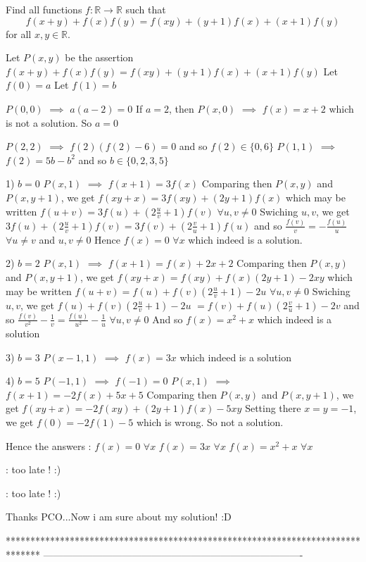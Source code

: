 \begin{solution}
	\begin{tcolorbox}Find all functions $f : \mathbb{R} \rightarrow \mathbb{R}$ such that
\[f(x+y) + f(x)f(y) = f(xy) + (y+1)f(x) + (x+1)f(y)\]
for all $x,y \in \mathbb{R}$.\end{tcolorbox}
Let $P(x,y)$ be the assertion $f(x+y)+f(x)f(y)=f(xy)+(y+1)f(x)+(x+1)f(y)$
Let $f(0)=a$
Let $f(1)=b$

$P(0,0)$ $\implies$ $a(a-2)=0$
If $a=2$, then $P(x,0)$ $\implies$ $f(x)=x+2$ which is not a solution.
So $a=0$

$P(2,2)$ $\implies$ $f(2)(f(2)-6)=0$ and so $f(2)\in\{0,6\}$
$P(1,1)$ $\implies$ $f(2)=5b-b^2$ and so $b\in\{0,2,3,5\}$

1) $b=0$
$P(x,1)$ $\implies$ $f(x+1)=3f(x)$
Comparing then $P(x,y)$ and $P(x,y+1)$, we get $f(xy+x)=3f(xy)+(2y+1)f(x)$ which may be written $f(u+v)=3f(u)+(2\frac uv+1)f(v)$ $\forall u,v\ne 0$
Swiching $u,v$, we get $3f(u)+(2\frac uv+1)f(v)=3f(v)+(2\frac vu +1)f(u)$ and so $\frac{f(v)}v=-\frac{f(u)}u$ $\forall u\ne v$ and $u,v\ne 0$
Hence $f(x)=0$ $\forall x$ which indeed is a solution.

2) $b=2$
$P(x,1)$ $\implies$ $f(x+1)=f(x)+2x+2$
Comparing then $P(x,y)$ and $P(x,y+1)$, we get $f(xy+x)=f(xy)+f(x)(2y+1)-2xy$ which may be written $f(u+v)=f(u)+f(v)(2\frac uv+1)-2u$ $\forall u,v\ne 0$
Swiching $u,v$, we get $f(u)+f(v)(2\frac uv+1)-2u$ $=f(v)+f(u)(2\frac vu+1)-2v$ and so $\frac{f(v)}{v^2}-\frac 1v=\frac{f(u)}{u^2}-\frac 1u$ $\forall u,v\ne 0$
And so $f(x)=x^2+x$ which indeed is a solution

3) $b=3$
$P(x-1,1)$ $\implies$ $f(x)=3x$ which indeed is a solution

4) $b=5$
$P(-1,1)$ $\implies$ $f(-1)=0$
$P(x,1)$ $\implies$ $f(x+1)=-2f(x)+5x+5$
Comparing then $P(x,y)$ and $P(x,y+1)$, we get $f(xy+x)=-2f(xy)+(2y+1)f(x)-5xy$
Setting there $x=y=-1$, we get $f(0)=-2f(1)-5$ which is wrong.
So not a solution.

Hence the answers :
$f(x)=0$ $\forall x$
$f(x)=3x$ $\forall x$
$f(x)=x^2+x$ $\forall x$


: too late ! :)
\end{solution}



\begin{solution}
	\begin{tcolorbox}

: too late ! :)\end{tcolorbox}

Thanks PCO...Now i am sure about my solution!  :D
\end{solution}
*******************************************************************************
-------------------------------------------------------------------------------


